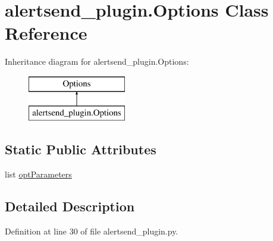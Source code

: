 \hypertarget{classalertsend__plugin_1_1_options}{\section{alertsend\-\_\-plugin.\-Options Class Reference}
\label{classalertsend__plugin_1_1_options}
}
Inheritance diagram for alertsend\-\_\-plugin.\-Options\-:\begin{figure}[H]
\begin{center}
\leavevmode
\includegraphics[height=2.000000cm]{dc/d60/classalertsend__plugin_1_1_options}
\end{center}
\end{figure}
\subsection*{Static Public Attributes}
\begin{DoxyCompactItemize}
\item 
list \hyperlink{classalertsend__plugin_1_1_options_a2c75b6ad0c6ebcf82a12c75c4fe17c82}{opt\-Parameters}
\end{DoxyCompactItemize}


\subsection{Detailed Description}


Definition at line 30 of file alertsend\-\_\-plugin.\-py.



